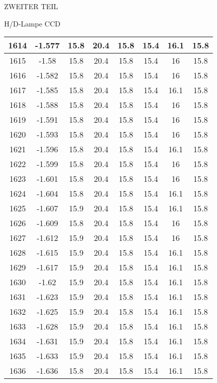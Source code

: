 \begin{appendix}
\begin{chapter}{ZWEITER TEIL}
\begin{section}{H/D-Lampe CCD}
\begin{scriptsize}
\begin{longtable}[htbp]{|c|c|c|c|c|c|c|c|}
            1614 & -1.577 & 15.8 & 20.4 & 15.8 & 15.4 & 16.1 & 15.8 \\ \hline
            1615 & -1.58 & 15.8 & 20.4 & 15.8 & 15.4 & 16 & 15.8 \\ \hline
            1616 & -1.582 & 15.8 & 20.4 & 15.8 & 15.4 & 16 & 15.8 \\ \hline
            1617 & -1.585 & 15.8 & 20.4 & 15.8 & 15.4 & 16.1 & 15.8 \\ \hline
            1618 & -1.588 & 15.8 & 20.4 & 15.8 & 15.4 & 16 & 15.8 \\ \hline
            1619 & -1.591 & 15.8 & 20.4 & 15.8 & 15.4 & 16 & 15.8 \\ \hline
            1620 & -1.593 & 15.8 & 20.4 & 15.8 & 15.4 & 16 & 15.8 \\ \hline
            1621 & -1.596 & 15.8 & 20.4 & 15.8 & 15.4 & 16.1 & 15.8 \\ \hline
            1622 & -1.599 & 15.8 & 20.4 & 15.8 & 15.4 & 16 & 15.8 \\ \hline
            1623 & -1.601 & 15.8 & 20.4 & 15.8 & 15.4 & 16 & 15.8 \\ \hline
            1624 & -1.604 & 15.8 & 20.4 & 15.8 & 15.4 & 16.1 & 15.8 \\ \hline
            1625 & -1.607 & 15.9 & 20.4 & 15.8 & 15.4 & 16.1 & 15.8 \\ \hline
            1626 & -1.609 & 15.8 & 20.4 & 15.8 & 15.4 & 16 & 15.8 \\ \hline
            1627 & -1.612 & 15.9 & 20.4 & 15.8 & 15.4 & 16 & 15.8 \\ \hline
            1628 & -1.615 & 15.9 & 20.4 & 15.8 & 15.4 & 16.1 & 15.8 \\ \hline
            1629 & -1.617 & 15.9 & 20.4 & 15.8 & 15.4 & 16.1 & 15.8 \\ \hline
            1630 & -1.62 & 15.9 & 20.4 & 15.8 & 15.4 & 16.1 & 15.8 \\ \hline
            1631 & -1.623 & 15.9 & 20.4 & 15.8 & 15.4 & 16.1 & 15.8 \\ \hline
            1632 & -1.625 & 15.9 & 20.4 & 15.8 & 15.4 & 16.1 & 15.8 \\ \hline
            1633 & -1.628 & 15.9 & 20.4 & 15.8 & 15.4 & 16.1 & 15.8 \\ \hline
            1634 & -1.631 & 15.9 & 20.4 & 15.8 & 15.4 & 16.1 & 15.8 \\ \hline
            1635 & -1.633 & 15.9 & 20.4 & 15.8 & 15.4 & 16.1 & 15.8 \\ \hline
            1636 & -1.636 & 15.8 & 20.4 & 15.8 & 15.4 & 16.1 & 15.8 \\ \hline

\end{longtable}
\end{scriptsize}
\end{section}
\end{chapter}
\end{appendix}
